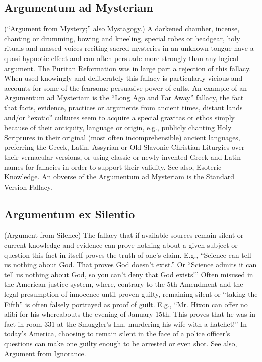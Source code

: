 \documentclass[10pt,a4paper,british]{article}
\begin{document}
\begin{multicols}{2}
	\subsection{Argumentum ad Mysteriam} (``Argument from Mystery;'' also Mystagogy.) A darkened chamber, incense, chanting or drumming, bowing and kneeling, special robes or headgear, holy rituals and massed voices reciting sacred mysteries in an unknown tongue  have a quasi{-}hypnotic effect and can often persuade more strongly than any logical argument.  The Puritan Reformation was in large part a rejection of this fallacy. When used knowingly and deliberately this fallacy is particularly vicious and accounts for some of the fearsome persuasive power of cults.  An example of an Argumentum ad Mysteriam is the ``Long Ago and Far Away'' fallacy, the fact that facts, evidence, practices or arguments from ancient times, distant lands and/or ``exotic'' cultures  seem to acquire a special gravitas or ethos simply because of their antiquity, language or origin, e.g., publicly chanting Holy Scriptures in their original (most often incomprehensible) ancient languages, preferring the Greek, Latin, Assyrian or Old Slavonic Christian Liturgies over their vernacular versions, or using classic or newly invented Greek and Latin names for fallacies in order to support their validity. See also, Esoteric Knowledge. An obverse of the Argumentum ad Mysteriam is the Standard Version Fallacy.  

	\subsection{Argumentum ex Silentio} (Argument from Silence) The fallacy that if available sources remain silent or current knowledge and evidence can prove nothing about a given subject or question this fact in itself proves the truth of one's claim. E.g., ``Science can tell us nothing about God.  That proves God doesn't exist.'' Or ``Science admits it can tell us nothing about God, so you can't deny that God exists!'' Often misused in the American justice system, where, contrary to the 5th Amendment and the legal presumption of innocence until proven guilty,  remaining silent or ``taking the Fifth'' is often falsely portrayed as proof of guilt. E.g., ``Mr. Hixon can offer no alibi for his whereabouts the evening of January 15th. This proves that he was in fact in room 331 at the Smuggler's Inn, murdering his wife with a hatchet!'' In today's America, choosing to remain silent in the face of a police officer's questions can make one guilty enough to be arrested or even shot. See also, Argument from Ignorance.  


\end{multicols}
\end{document}
